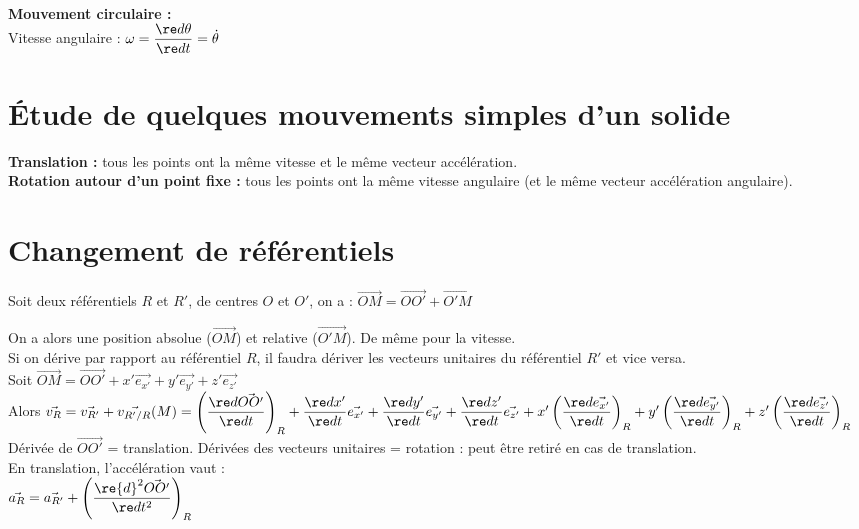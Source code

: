 \documentclass[13pt, twoside, a4paper, french]{report}
\begin{document}
    \\
    \textbf{Mouvement circulaire :}\\
    Vitesse angulaire : $\omega = \dfrac{\re d \theta}{\re d t} = \dot \theta$
  
  
  \section{Étude de quelques mouvements simples d’un solide}\label{sec:etude-de-quelques-mouvements-simples-dun-solide}
    
    \textbf{Translation :} tous les points ont la même vitesse et le même vecteur accélération.\\
    
    \textbf{Rotation autour d'un point fixe :} tous les points ont la même vitesse angulaire (et le même vecteur accélération angulaire).
  
  
  \section{Changement de référentiels}\label{sec:changement-de-referentiels}
    
    Soit deux référentiels $R$ et $R'$, de centres $O$ et $O'$, on a : $\vec{OM} = \vec{OO'} + \vec{O'M}$
    
    On a alors une position absolue ($\vec{OM}$) et relative ($\vec{O'M}$).
    De même pour la vitesse.\\
    
    Si on dérive par rapport au référentiel $R$, il faudra dériver les vecteurs unitaires du référentiel $R'$ et vice versa.\\
    
    Soit $\vec{OM} = \vec{OO'} + x' \vec{e_{x'}} + y' \vec{e_{y'}} + z' \vec{e_{z'}}$\\
    Alors $\vec{v_{R}} = \vec{v_{R'}} + \vec{v_{R'/R}}(M) = \left( \dfrac{\re d \vec{OO'}}{\re d t} \right)_R + \dfrac{\re d x'}{\re d t} \vec{e_{x'}} + \dfrac{\re d y'}{\re d t} \vec{e_{y'}} + \dfrac{\re d z'}{\re d t} \vec{e_{z'}} + x' \left( \dfrac{\re d \vec{e_{x'}}}{\re d t} \right)_R + y' \left( \dfrac{\re d \vec{e_{y'}}}{\re d t} \right)_R + z' \left( \dfrac{\re d \vec{e_{z'}}}{\re d t} \right)_R$\\
    
    Dérivée de $\vec{OO'}$ = translation.
    Dérivées des vecteurs unitaires = rotation : peut être retiré en cas de translation.\\
    En translation, l'accélération vaut :\\
    
    $\vec{a_R} = \vec{a_{R'}} + \left( \dfrac{\re{d}^2 \vec{OO'}}{\re d t^2} \right)_R$
    
\end{document}

